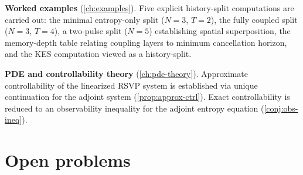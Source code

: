 \documentclass[12pt, oneside]{memoir}
\begin{document}
\medskip\noindent
\textbf{Worked examples}
(\cref{ch:examples}).  Five explicit history-split computations are carried out: the
minimal entropy-only split ($N=3$, $T=2$), the fully coupled split ($N=3$, $T=4$), a
two-pulse split ($N=5$) establishing spatial superposition, the memory-depth table
relating coupling layers to minimum cancellation horizon, and the KES computation
viewed as a history-split.

\medskip\noindent
\textbf{PDE and controllability theory}
(\cref{ch:pde-theory}).  Approximate controllability of the linearized RSVP system is
established via unique continuation for the adjoint system (\cref{prop:approx-ctrl}).
Exact controllability is reduced to an observability inequality for the adjoint entropy
equation (\cref{conj:obs-ineq}).

\section{Open problems}
\end{document}
